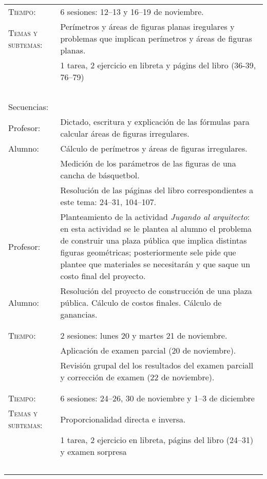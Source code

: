 \documentclass[letterpaper,10pt]{article}
\begin{document}
\begin{tabular}[t]{R{0.25\textwidth}p{0.71\textwidth}}

    \textsc{Tiempo:}                    & 6 sesiones: 12--13 y 16--19  de noviembre. \\
    \textsc{Temas y subtemas:}          & Per\'imetros y \'areas de figuras planas iregulares y problemas que implican per\'imetros y \'areas de figuras planas.\\
              & 1 tarea, 2 ejercicio en libreta y p\'agins del libro (36-39, 76--79) \\ \\
    \large{\sc Secuencias:} \\
    Profesor:   & Dictado, escritura y explicaci\'on de las f\'ormulas para calcular \'areas de figuras irregulares. \\
    Alumno:     & C\'alculo de per\'imetros y \'areas de figuras irregulares. \\
                & Medici\'on de los par\'ametros de las figuras de una cancha de b\'asquetbol.  \\
                & Resoluci\'on de las p\'aginas del libro correspondientes a este tema: 24--31, 104--107. \\
    Profesor:   & Planteamiento de la actividad \textit{Jugando al arquitecto}: en esta actividad se le plantea al alumno el problema de construir una plaza p\'ublica que implica distintas figuras geom\'etricas; posteriormente sele pide que plantee que materiales se necesitar\'an y que saque un costo final del proyecto. \\
    Alumno:     & Resoluci\'on del proyecto de construcci\'on de una plaza p\'ublica. C\'alculo de costos finales. C\'alculo de ganancias.\\
\\ \hline \\
 
    \textsc{Tiempo:}& 2 sesiones: lunes 20 y martes 21  de noviembre. \\
                    & {\Large \sc Aplicaci\'on de examen parcial} (20 de noviembre). \\ 
                    & Revisi\'on grupal del los resultados del examen parciall y correcci\'on de examen (22 de noviembre).\\
\\ \hline \\
    \textsc{Tiempo:}                    & 6 sesiones: 24--26, 30 de noviembre y 1--3 de diciembre \\
    \textsc{Temas y subtemas:}          & Proporcionalidad directa e inversa. \\
              & 1 tarea, 2 ejercicio en libreta, p\'agins del libro (24--31) y examen sorpresa \\ \\


\end{tabular}
\end{document}
